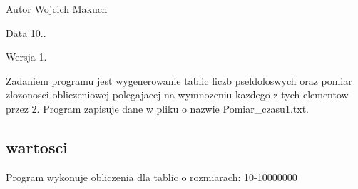 \begin{DoxyAuthor}{Autor}
Wojcich Makuch 
\end{DoxyAuthor}
\begin{DoxyDate}{Data}
10.. 
\end{DoxyDate}
\begin{DoxyVersion}{Wersja}
1.
\end{DoxyVersion}
Zadaniem programu jest wygenerowanie tablic liczb pseldoloswych oraz pomiar zlozonosci obliczeniowej polegajacej na wymnozeniu kazdego z tych elementow przez 2. Program zapisuje dane w pliku o nazwie Pomiar\+\_\+czasu1.\+txt.\hypertarget{index_wartosci}{}\subsection{wartosci}\label{index_wartosci}
Program wykonuje obliczenia dla tablic o rozmiarach\+: 10-\/10000000 